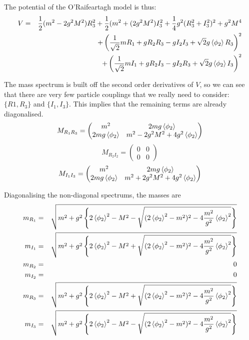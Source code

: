 The potential of the O'Raifeartagh model is thus:
\begin{eqnarray}
    V &=& \frac{1}{2} (m^2 - 2g^2 M^2) R_3^2 + \frac{1}{2} (m^2 + (2g^2 M^2) I_3^2 + \frac{1}{4}g^2 (R_3^2 + I_3^2)^2 + g^2M^4 \nonumber \\
    && + \left(\frac{1}{\sqrt{2}} m R_1 + g R_2 R_3 - g I_2 I_3 + \sqrt{2}g\braket{\phi_2} R_3\right)^2 \nonumber \\
    && + \left(\frac{1}{\sqrt{2}} m I_1 + g R_2 I_3 - g I_2 R_3 + \sqrt{2}g\braket{\phi_2} I_3\right)^2 
\end{eqnarray}

The mass spectrum is built off the second order derivatives of $V$, so we can see that there are very few particle couplings that we really need to consider: $\{R1, R_3\}$ and $\{I_1, I_3\}$. This implies that the remaining terms are already diagonalised.
\begin{equation}
    M_{R_1 R_3} =
    \begin{pmatrix}
        m^2 & 2mg\braket{\phi_2}\\
        2mg\braket{\phi_2} & m^2 - 2g^2 M^2 + 4g^2 \braket{\phi_2}
    \end{pmatrix}
\end{equation}
\begin{equation}
    M_{R_2 I_2} = 
    \begin{pmatrix}
        0 & 0\\ 0 & 0
    \end{pmatrix}
\end{equation}
\begin{equation}
    M_{I_1 I_3} = 
    \begin{pmatrix}
        m^2 & 2mg\braket{\phi_2} \\
        2mg\braket{\phi_2} & m^2 + 2g^2 M^2 + 4g^2 \braket{\phi_2}
    \end{pmatrix}
\end{equation}

Diagonalising the non-diagonal spectrums, the masses are
\begin{eqnarray}
    m_{R_1} &=& \sqrt{m^2 + g^2 \left\lbrace 2\braket{\phi_2}^2 - M^2 - \sqrt{(2\braket{\phi_2}^2 - m^2) ^2 - 4\frac{m^2}{g^2} \braket{\phi_2}^2} \right\rbrace} \nonumber \\
    m_{I_1} &=& \sqrt{m^2 + g^2 \left\lbrace 2\braket{\phi_2}^2 - M^2 + \sqrt{(2\braket{\phi_2}^2 - m^2) ^2 - 4\frac{m^2}{g^2} \braket{\phi_2}^2} \right\rbrace} \nonumber \\
    m_{R_2} &=& 0 \nonumber \\
    m_{I_2} &=& 0 \nonumber \\
    m_{R_3} &=& \sqrt{m^2 + g^2 \left\lbrace 2\braket{\phi_2}^2 - M^2 + \sqrt{(2\braket{\phi_2}^2 - m^2) ^2 - 4\frac{m^2}{g^2} \braket{\phi_2}^2} \right\rbrace} \nonumber \\
    m_{I_3} &=& \sqrt{m^2 + g^2 \left\lbrace 2\braket{\phi_2}^2 - M^2 - \sqrt{(2\braket{\phi_2}^2 - m^2) ^2 - 4\frac{m^2}{g^2} \braket{\phi_2}^2} \right\rbrace} \nonumber \\
\end{eqnarray}

